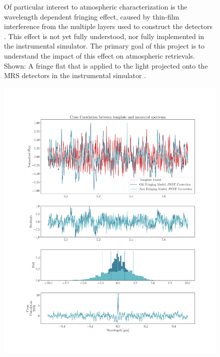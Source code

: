 \documentclass[]{article}
\begin{document}
\begin{figure}[h]
\begin{minipage}{0.45\linewidth}
	\caption{Of particular interest to atmospheric characterization is the wavelength dependent fringing effect, caused by thin-film interference from the multiple layers used to construct the detectors \cite{Argyriou2018a}. This effect is not yet fully understood, nor fully implemented in the instrumental simulator. The primary goal of this project is to understand the impact of this effect on atmospheric retrievals. Shown: A fringe flat that is applied to the light projected onto the MRS detectors in the instrumental simulator .}	
	\end{minipage}
\end{figure}
\begin{figure}[h]
	\centering
	\includegraphics[width=\linewidth, trim = 2cm 3cm 1cm 5cm,scale = 1.2]{hr8799e15pc_offaxnewold_cor_v1}

\end{figure}
\end{document}
